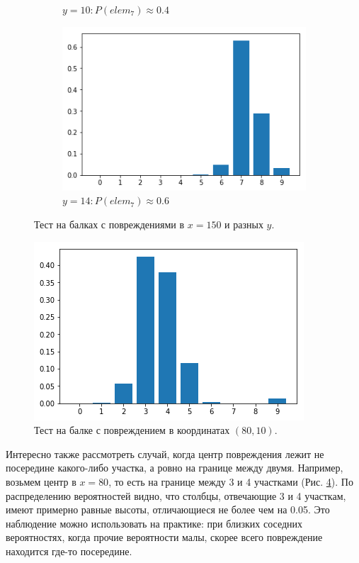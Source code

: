 \documentclass[a4paper,12pt]{article}
\theoremstyle{remark}
\begin{document}
\begin{figure}[h]
\begin{subfigure}{0.33\textwidth}
			\caption{$y=10: P(elem_7)\approx0.4$}
			\label{fig:nn1_damage_150_10}
		\end{subfigure}
		\begin{subfigure}{0.33\textwidth}
			\includegraphics[width=\linewidth]{nn1_damage_150_14.png}
			\caption{$y=14: P(elem_7)\approx0.6$}
			\label{fig:nn1_damage_150_14}
		\end{subfigure}
		\caption{Тест на балках с повреждениями в $x=150$ и разных $y$.}
		\label{fig:nn1_damage_150}
	\end{figure}

	\begin{figure} 
		\includegraphics[width=\linewidth]{nn1_damage_80_10.png}
		\caption{Тест на балке с повреждением в координатах $(80, 10)$.}
		\label{fig:nn1_damage_80_10}
	\end{figure}
	Интересно также рассмотреть случай, когда центр повреждения лежит не посередине какого-либо участка, а ровно на границе между двумя. Например, возьмем центр в $x=80$, то есть на границе между 3 и 4 участками (Рис. \ref{fig:nn1_damage_80_10}). По распределению вероятностей видно, что столбцы, отвечающие 3 и 4 участкам, имеют примерно равные высоты, отличающиеся не более чем на 0.05. Это наблюдение можно использовать на практике: при близких соседних вероятностях, когда прочие вероятности малы, скорее всего повреждение находится где-то посередине.
	
\end{document}
